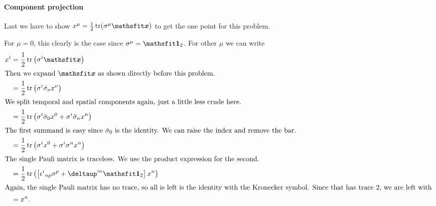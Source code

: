 \documentclass[11pt, english, fleqn, DIV=15, headinclude, BCOR=1cm]{scrartcl}
\begin{document}
\paragraph{Component projection}

Last we have to show $x^\mu = \frac12 \tr(\sigma^\mu \tens x)$ to get the one
point for this problem.

For $\mu = 0$, this clearly is the case since $\sigma^\mu = \tens 1_2$. For
other $\mu$ we can write
\begin{align*}
    x^i &= \frac12 \tr\del{\sigma^i \tens x} \\
    \intertext{%
        Then we expand $\tens x$ as shown directly before this problem.
    }
    &= \frac12 \tr\del{\sigma^i \bar\sigma_\nu x^\nu} \\
    \intertext{%
        We split temporal and spatial components again, just a little less
        crude here.
    }
    &= \frac12 \tr\del{\sigma^i \bar\sigma_0 x^0 + \sigma^i \bar\sigma_n x^n} \\
    \intertext{%
        The first summand is easy since $\bar\sigma_0$ is the identity. We can
        raise the index and remove the bar.
    }
    &= \frac12 \tr\del{\sigma^i x^0 + \sigma^i \sigma^n x^n} \\
    \intertext{%
        The single Pauli matrix is traceless. We use the product expression for
        the second.
    }
    &= \frac12 \tr\del{\sbr{\epsilon^i{}_{np} \sigma^p + \deltaup^{in} \tens
    1_2} x^n} \\
    \intertext{%
        Again, the single Pauli matrix has no trace, so all is left is the
        identity with the Kronecker symbol. Since that has trace 2, we are left
        with
    }
    &= x^n.
\end{align*}
\end{document}
